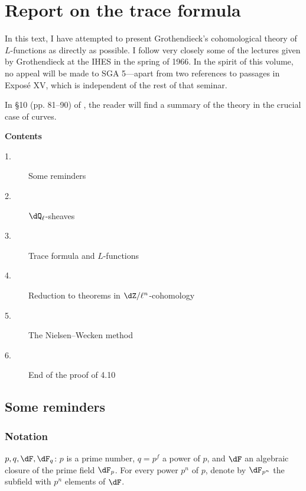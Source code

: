 

\chapter{Report on the trace formula}\label{II}

In this text, I have attempted to present Grothendieck's cohomological theory
of $L$-functions as directly as possible. I follow very closely some of the
lectures given by Grothendieck at the IHES in the spring of 1966. In the
spirit of this volume, no appeal will be made to SGA 5---apart from two
references to passages in Exposé XV, which is independent of the rest of that
seminar.

In \S 10 (pp. 81--90) of , the reader will find a summary of the
theory in the crucial case of curves.










\begin{center}\textbf{Contents}\end{center}
\begin{description}
\item[1.] Some reminders 
\item[2.] $\dQ_\ell$-sheaves 
\item[3.] Trace formula and $L$-functions 
\item[4.] Reduction to theorems in $\dZ/\ell^n$-cohomology 
\item[5.] The Nielsen--Wecken method 
\item[6.] End of the proof of 4.10 
\end{description}

\section{Some reminders}\label{II:1}





\subsection{Notation}\label{II:1-1}

$p,q,\dF,\dF_q$: $p$ is a prime number, $q=p^f$ a power of $p$, and $\dF$
an algebraic closure of the prime field $\dF_p$. For every power $p^n$ of
$p$, denote by $\dF_{p^n}$ the subfield with $p^n$ elements of $\dF$.

